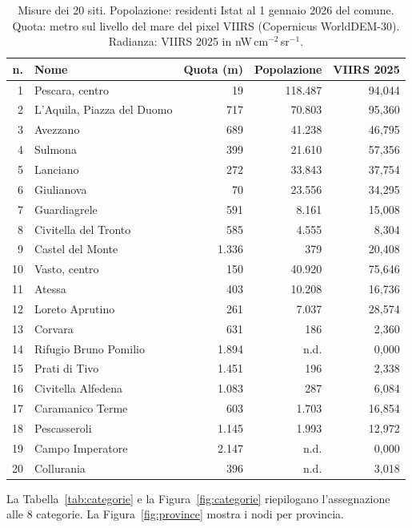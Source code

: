 \documentclass[11pt,a4paper]{report}
\begin{document}
\FloatBarrier

\begin{table}[ht!]
\centering
\renewcommand{\arraystretch}{1.5}
\small

\begin{tabular}{@{}r l r r r@{}}
\toprule
n. & Nome & Quota (m) & Popolazione & VIIRS 2025 \\
\midrule
1 & Pescara, centro & 19 & 118.487 & 94,044 \\
2 & L'Aquila, Piazza del Duomo & 717 & 70.803 & 95,360 \\
3 & Avezzano & 689 & 41.238 & 46,795 \\
4 & Sulmona & 399 & 21.610 & 57,356 \\
5 & Lanciano & 272 & 33.843 & 37,754 \\
6 & Giulianova & 70 & 23.556 & 34,295 \\
7 & Guardiagrele & 591 & 8.161 & 15,008 \\
8 & Civitella del Tronto & 585 & 4.555 & 8,304 \\
9 & Castel del Monte & 1.336 & 379 & 20,408 \\
10 & Vasto, centro & 150 & 40.920 & 75,646 \\
11 & Atessa & 403 & 10.208 & 16,736 \\
12 & Loreto Aprutino & 261 & 7.037 & 28,574 \\
13 & Corvara & 631 & 186 & 2,360 \\
14 & Rifugio Bruno Pomilio & 1.894 & n.d. & 0,000 \\
15 & Prati di Tivo & 1.451 & 196 & 2,338 \\
16 & Civitella Alfedena & 1.083 & 287 & 6,084 \\
17 & Caramanico Terme & 603 & 1.703 & 16,854 \\
18 & Pescasseroli & 1.145 & 1.993 & 12,972 \\
19 & Campo Imperatore & 2.147 & n.d. & 0,000 \\
20 & Collurania & 396 & n.d. & 3,018 \\
\bottomrule
\end{tabular}

\caption{Misure dei 20 siti. Popolazione: residenti Istat al 1 gennaio 2026 del comune. Quota: metro sul livello del mare del pixel VIIRS (Copernicus WorldDEM-30). Radianza: VIIRS 2025 in nW\,cm$^{-2}$\,sr$^{-1}$.}
\label{tab:misure}
\end{table}

\FloatBarrier

La Tabella~\ref{tab:categorie} e la Figura~\ref{fig:categorie} riepilogano l'assegnazione alle 8 categorie. La Figura~\ref{fig:province} mostra i nodi per provincia.
\end{document}
